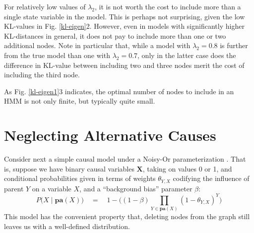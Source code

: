 \documentclass[10pt,letterpaper]{article}
\begin{document}
\noindent For relatively low values of $\lambda_2$, it is not worth the cost to include more than a single state variable in the model. This is perhaps not surprising, given the low KL-values in Fig. \ref{kl-eigen}2. However, even in models with significantly higher KL-distances in general, it does not pay to include more than one or two additional nodes. Note in particular that, while a model with $\lambda_2=0.8$ is further from the true model than one with $\lambda_2=0.7$, only in the latter case does the difference in KL-value between including two and three nodes merit the cost of including the third node. 

As Fig. \ref{kl-eigen1}3 indicates, the optimal number of nodes to include in an HMM is not only finite, but typically quite small.

\section{Neglecting Alternative Causes}

Consider next a simple causal model under a Noisy-Or parameterization \citep{Cheng}. That is, suppose we have binary causal variables $\textbf{X}$, taking on values 0 or 1, and conditional probabilities given in terms of weights $\theta_{Y,X}$ codifying the influence of parent $Y$ on a variable $X$, and a ``background bias'' parameter $\beta$: $$P\big(X\mid \textbf{pa}(X)\big) \quad = \quad 1-\Big((1-\beta)\prod_{Y \in \textbf{pa}(X)} (1-\theta_{Y,X})^Y\Big)$$
This model has the convenient property that, deleting nodes from the graph still leaves us with a well-defined distribution.
\end{document}
